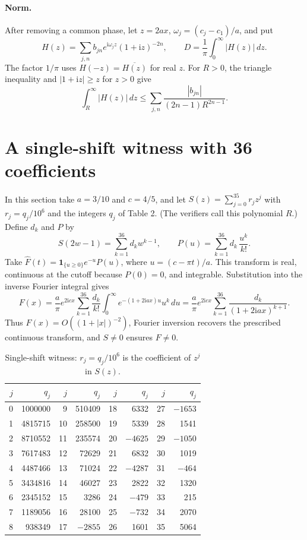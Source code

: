 \documentclass[11pt]{article}
\newcommand{\ii}{\mathrm i}
\begin{document}
\paragraph{Norm.} After removing a common phase, let $z=2ax$,
$\omega_j=(c_j-c_1)/a$, and put
\[
 H(z)=\sum_{j,n} b_{jn} e^{\ii\omega_j z}(1+\ii z)^{-2n},\qquad
 D=\frac1\pi\int_0^\infty |H(z)|\,dz .
\]
The factor $1/\pi$ uses $H(-z)=\overline{H(z)}$ for real $z$. For $R>0$,
the triangle inequality and $|1+\ii z|\ge z$ for $z>0$ give
\begin{equation}
 \int_R^\infty |H(z)|\,dz
 \le\sum_{j,n}\frac{|b_{jn}|}{(2n-1)R^{2n-1}} . \label{eq:tail}
\end{equation}

\newpage
\section{A single-shift witness with 36 coefficients}
In this section take $a=3/10$ and $c=4/5$, and let
$S(z)=\sum_{j=0}^{35}r_jz^j$ with $r_j=q_j/10^6$ and the integers $q_j$
of Table 2. (The verifiers call this polynomial $R$.) Define $d_k$ and
$P$ by
\[
 S(2w-1)=\sum_{k=1}^{36}d_k w^{k-1},
 \qquad P(u)=\sum_{k=1}^{36}d_k\,\frac{u^k}{k!}.
\]
Take $\widehat F(t)=\mathbf 1_{\{u\ge0\}}e^{-u}P(u)$, where
$u=(c-\pi t)/a$. This transform is real, continuous at the cutoff because
$P(0)=0$, and integrable. Substitution into the inverse Fourier integral
gives
\[
 F(x)=\frac a\pi e^{2\ii cx}\sum_{k=1}^{36}
      \frac{d_k}{k!}\int_0^\infty e^{-(1+2\ii ax)u}u^k\,du
     =\frac a\pi e^{2\ii cx}\sum_{k=1}^{36}\frac{d_k}{(1+2\ii ax)^{k+1}}.
\]
Thus $F(x)=O((1+|x|)^{-2})$, Fourier inversion recovers the prescribed
continuous transform, and $S\ne0$ ensures $F\ne0$.

\begin{table}[h]
\centering
\setlength{\tabcolsep}{8pt}
\begin{tabular}{@{}rr@{\qquad}rr@{\qquad}rr@{\qquad}rr@{}}
\toprule
$j$&$q_j$&$j$&$q_j$&$j$&$q_j$&$j$&$q_j$\\
\midrule
0 & 1000000 &  9 & 510409 & 18 & 6332    & 27 & $-1653$\\
1 & 4815715 & 10 & 258500 & 19 & 5339    & 28 & 1541\\
2 & 8710552 & 11 & 235574 & 20 & $-4625$ & 29 & $-1050$\\
3 & 7617483 & 12 & 72629  & 21 & 6832    & 30 & 1019\\
4 & 4487466 & 13 & 71024  & 22 & $-4287$ & 31 & $-464$\\
5 & 3434816 & 14 & 46027  & 23 & 2822    & 32 & 1320\\
6 & 2345152 & 15 & 3286   & 24 & $-479$  & 33 & 215\\
7 & 1189056 & 16 & 28100  & 25 & $-732$  & 34 & 2070\\
8 & 938349  & 17 & $-2855$ & 26 & 1601   & 35 & 5064\\
\bottomrule
\end{tabular}
\caption{Single-shift witness: $r_j=q_j/10^6$ is the coefficient of $z^j$ in $S(z)$.}
\end{table}
\end{document}
